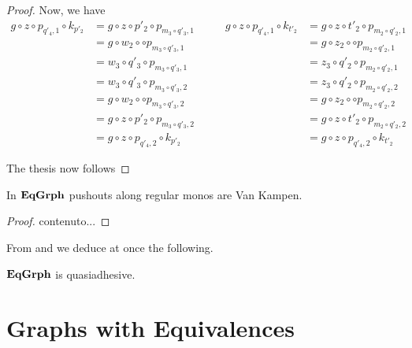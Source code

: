 \begin{proof}
Now, we have
\[
\begin{split}
	g\circ z\circ p_{q'_4,1} \circ k_{p'_2}&=g\circ z\circ p'_2\circ p_{m_3\circ q'_3, 1}\\&=g\circ w_2\circ \circ  p_{m_3\circ q'_3, 1}\\&=w_3\circ q'_3\circ p_{m_3\circ q'_3, 1}\\&=w_3\circ q'_3\circ p_{m_3\circ q'_3, 2}\\&=g\circ w_2\circ \circ  p_{m_3\circ q'_3, 2}\\&=g\circ z\circ p'_2\circ p_{m_3\circ q'_3, 2}\\&=g\circ z\circ p_{q'_4,2} \circ k_{p'_2}
\end{split} \qquad 
\begin{split}
g\circ z\circ p_{q'_4,1} \circ k_{t'_2}&=g\circ z\circ t'_2\circ p_{m_2\circ q'_2, 1}\\&=g\circ z_2\circ \circ  p_{m_2\circ q'_2, 1}\\&=z_3\circ q'_2\circ p_{m_2\circ q'_2, 1}\\&=z_3\circ q'_2\circ p_{m_2\circ q'_2, 2}\\&=g\circ z_2\circ \circ  p_{m_2\circ q'_2, 2}\\&=g\circ z\circ t'_2\circ p_{m_2\circ q'_2, 2}\\&=g\circ z\circ p_{q'_4,2} \circ k_{t'_2}
\end{split}
\]

The thesis now follows 







\end{proof}


\begin{lemma}\label{lem:vk}
In $\mathbf{EqGrph}$ pushouts along regular monos are Van Kampen.
\end{lemma}
\begin{proof}
	contenuto...
\end{proof}

From  and  we deduce at once the following.

\begin{cor}\label{cor:equi}
	$\mathbf{EqGrph}$ is quasiadhesive.
\end{cor}




\color{black}
\section{Graphs with Equivalences}

